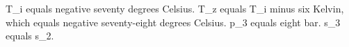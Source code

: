 T_i equals negative seventy degrees Celsius.  
T_z equals T_i minus six Kelvin, which equals negative seventy-eight degrees Celsius.  
p_3 equals eight bar.  
s_3 equals s_2.